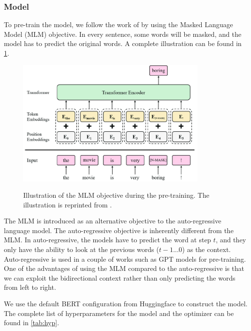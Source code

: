 \subsubsection{Model}
To pre-train the model, we follow the work of \cite{devlin2018bert} by using the Masked Language Model (MLM) objective. In every sentence, some words will be masked, and the model has to predict the original words. A complete illustration can be found in \cref{img:mlmobj}.

\begin{figure}[h]
    {\includegraphics[width=0.85\textwidth]{img/mlm_obj.png}}
    \centering
    \caption{Illustration of the MLM objective during the pre-training. The illustration is reprinted from \cite{Park2019SelfSupervisedCD}.}
    \label{img:mlmobj}
\end{figure}

The MLM is introduced as an alternative objective to the auto-regressive language model. The auto-regressive objective is inherently different from the MLM. In auto-regressive, the models have to predict the word at step $t$, and they only have the ability to look at the previous words ($t-1...0$) as the context. Auto-regressive is used in a couple of works such as GPT models  for pre-training. One of the advantages of using the MLM compared to the auto-regressive is that we can exploit the bidirectional context rather than only predicting the words from left to right.

We use the default BERT configuration from Huggingface to construct the model. The complete list of hyperparameters for the model and the optimizer can be found in \cref{tab:hyp}.

